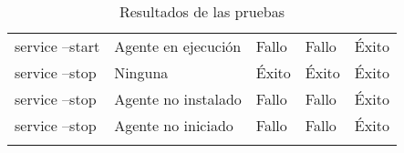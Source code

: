 \begin{table}[H]
{\begin{tabular}{lllll}
                         service --start                            &   Agente en ejecución                     &   Fallo                   &   Fallo                   &   Éxito                     \\
                         service --stop                             &   Ninguna                                 &   Éxito                   &   Éxito                   &   Éxito                     \\
                         service --stop                             &   Agente no instalado                     &   Fallo                   &   Fallo                   &   Éxito                     \\
                         service --stop                             &   Agente no iniciado                      &   Fallo                   &   Fallo                   &   Éxito                     \\
                        \hline&
                    \end{tabular}
                }
            \caption{Resultados de las pruebas}
            \label{tab:test-results}
        \end{table}